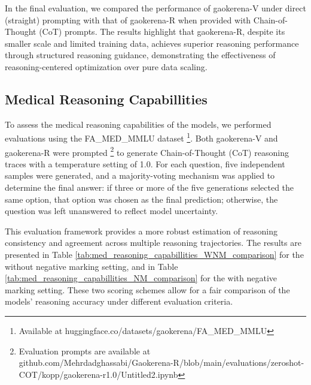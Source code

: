 \documentclass[conference]{IEEEtran}
\begin{document}
In the final evaluation, we compared the performance of gaokerena-V under direct (straight) prompting with that of gaokerena-R when provided with Chain-of-Thought (CoT) prompts. The results highlight that gaokerena-R, despite its smaller scale and limited training data, achieves superior reasoning performance through structured reasoning guidance, demonstrating the effectiveness of reasoning-centered optimization over pure data scaling.
          \subsection{Medical Reasoning Capabillities}
To assess the medical reasoning capabilities of the models, we performed evaluations using the FA\_MED\_MMLU dataset
\footnote{Available at huggingface.co/datasets/gaokerena/FA\_MED\_MMLU}.
 Both gaokerena-V and gaokerena-R were prompted
\footnote{Evaluation prompts are available at github.com/Mehrdadghassabi/Gaokerena-R/blob/main/evaluations/zeroshot-COT/kopp/gaokerena-r1.0/Untitled2.ipynb} 
to generate Chain-of-Thought (CoT) reasoning traces with a temperature setting of 1.0. For each question, five independent samples were generated, and a majority-voting mechanism was applied to determine the final answer: if three or more of the five generations selected the same option, that option was chosen as the final prediction; otherwise, the question was left unanswered to reflect model uncertainty.  

This evaluation framework provides a more robust estimation of reasoning consistency and agreement across multiple reasoning trajectories. The results are presented in Table
\ref{tab:med_reasoning_capabillities_WNM_comparison}
 for the without negative marking setting, and in Table
\ref{tab:med_reasoning_capabillities_NM_comparison}
 for the with negative marking setting. These two scoring schemes allow for a fair comparison of the models’ reasoning accuracy under different evaluation criteria.
\end{document}
